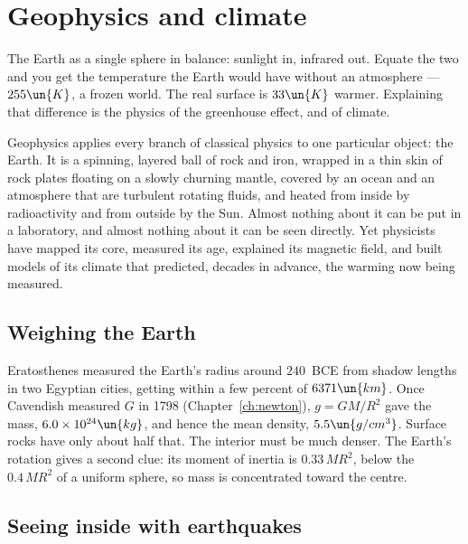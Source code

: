 \chapter{Geophysics and climate}
\label{ch:geo}



\begin{prototype}
The Earth as a single sphere in balance: sunlight in, infrared out. Equate the two and you get the temperature the Earth would have without an atmosphere --- $255\un{K}$, a frozen world. The real surface is $33\un{K}$ warmer. Explaining that difference is the physics of the greenhouse effect, and of climate.
\end{prototype}

Geophysics applies every branch of classical physics to one particular object: the Earth. It is a spinning, layered ball of rock and iron, wrapped in a thin skin of rock plates floating on a slowly churning mantle, covered by an ocean and an atmosphere that are turbulent rotating fluids, and heated from inside by radioactivity and from outside by the Sun. Almost nothing about it can be put in a laboratory, and almost nothing about it can be seen directly. Yet physicists have mapped its core, measured its age, explained its magnetic field, and built models of its climate that predicted, decades in advance, the warming now being measured.

\section{Weighing the Earth}

Eratosthenes measured the Earth's radius around $240$~BCE from shadow lengths in two Egyptian cities, getting within a few percent of $6371\un{km}$. Once Cavendish measured $G$ in 1798 (Chapter~\ref{ch:newton}), $g = GM/R^2$ gave the mass, $6.0\times10^{24}\un{kg}$, and hence the mean density, $5.5\un{g/cm^3}$. Surface rocks have only about half that. The interior must be much denser. The Earth's rotation gives a second clue: its moment of inertia is $0.33\,MR^2$, below the $0.4\,MR^2$ of a uniform sphere, so mass is concentrated toward the centre.

\section{Seeing inside with earthquakes}

